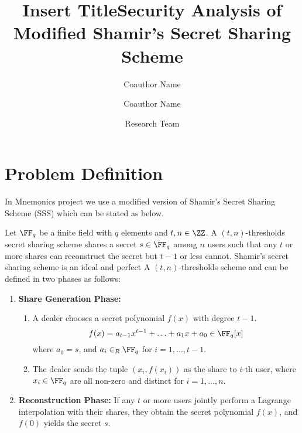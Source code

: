 \documentclass[envcountsame,runningheads,notitlepage]{llncs}
\title{Insert Title}
\date{}
\author{
	Coauthor Name\inst{1} \and
	Coauthor Name\inst{2}
}%
\institute{Coauthor University\\
	\href{mailto:mail@mail.com}{mail@mail.com} \and
	Coauthor University\\
	\href{mailto:mail@mail.com}{mail@mail.com}
}  %
\author{}
\institute{}
\begin{document}
	\title{Security Analysis of Modified Shamir's Secret Sharing Scheme}
	
	\author{Research Team}
	\maketitle
	
	\section{Problem Definition}
	In Mnemonics project we use a modified version of Shamir's Secret Sharing Scheme (SSS) \cite{Shamir79} which can be stated as below. 
	
	\begin{definition}\label{def:shamir}
		Let $\FF_q$ be a finite field with $q$ elements and $t,n \in \ZZ$. A $(t, n)$-thresholds secret sharing scheme shares a secret $s \in \FF_q$ among $n$ users such that any $t$ or more shares can reconstruct the secret but $t-1$ or less cannot. Shamir's secret sharing scheme is an ideal and perfect A $(t, n)$-thresholds scheme and can be defined in two phases as follows:
		
		\begin{enumerate}
			\item \textbf{Share Generation Phase:} 
			\begin{enumerate}
				\item A dealer chooses a secret polynomial $f (x)$ with degree $t - 1$.
				\begin{equation*}
				f (x) = a_{t-1}x^{t-1} + \ldots + a_1x + a_0 \in \FF_q [x]
				\end{equation*}
				where $a_0 = s$, and $a_i \in_{R} \FF_q$ for $i = 1, \ldots, t-1$. 
				\item The dealer sends the tuple $(x_{i}, f (x_{i}))$ as the share to $i$-th user, where $x_{i} \in \FF_q$ are all non-zero and distinct for $i = 1, \ldots, n$. 
			\end{enumerate}
			
			\item \textbf{Reconstruction Phase:} 
			If any $t$ or more users jointly perform a Lagrange interpolation with their shares, they obtain the secret polynomial $f (x)$, and $f(0)$ yields the secret $s$.
		\end{enumerate}
	\end{definition}
	
\end{document}
